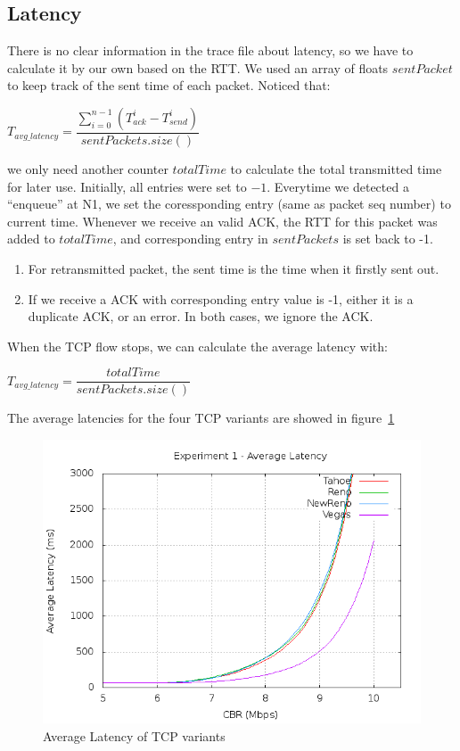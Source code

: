 \documentclass[10pt, conference]{lib/IEEEtran}
\begin{document}
\subsection{Latency}
There is no clear information in the trace file about latency, so we 
have to calculate it by our own based on the RTT. We used an array of 
floats $sentPacket$ to keep track of the sent time of each packet. 
Noticed that:
\begin{center}
    $T_{avg\_latency} = \dfrac{\sum_{i = 0}^{n - 1} (T_{ack}^i - T_{send}^i)}{sentPackets.size()}$
\end{center}
we only need another counter $totalTime$ to calculate the total transmitted time 
for later use.
Initially, all entries were set to $-1$. Everytime we detected a 
``enqueue'' at N1, we set the coressponding entry (same as packet seq 
number) to current time. Whenever we receive an valid ACK, the RTT for 
this packet was added to $totalTime$, and corresponding entry in 
$sentPackets$ is set back to -1. 
\begin{enumerate}
    \item For retransmitted packet, the sent time is the time when it firstly sent out.
    \item If we receive a ACK with corresponding entry value is -1, either it is a duplicate ACK, or an error. In both cases, we ignore the ACK.
\end{enumerate}
When the TCP flow stops, we can calculate the average latency with:
\begin{center}
    $T_{avg\_latency} = \dfrac{totalTime}{sentPackets.size()}$
\end{center}
The average latencies for the four TCP variants are showed in figure~\ref{fig:exp1_lt}
\begin{figure}[!htb]
    \centering
    \includegraphics[width=1.0\linewidth]{plot/exp1-lt.png}
    \caption{Average Latency of TCP variants}
    \label{fig:exp1_lt}
\end{figure}
\end{document}
